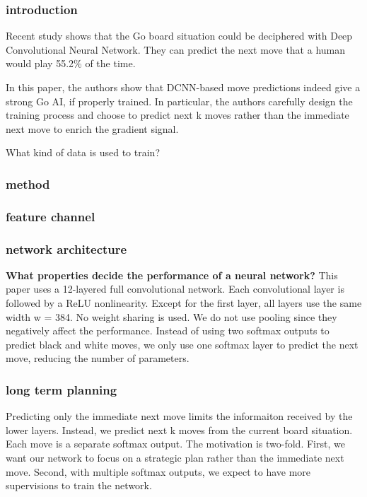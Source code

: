 \subsubsection{introduction}
Recent study shows that the Go board situation could be deciphered with Deep Convolutional Neural Network. They can predict the next move that a human would play 55.2\% of the time.

In this paper, the authors show that DCNN-based move predictions indeed give a strong Go AI, if properly trained. In particular, the authors carefully design the training process and choose to predict next k moves rather than the immediate next move to enrich the gradient signal.

What kind of data is used to train?
\subsubsection{method}
\subsubsection{feature channel}
\subsubsection{network architecture}
\textbf{What properties decide the performance of a neural network?}
This paper uses a 12-layered full convolutional network. Each convolutional layer is followed by a ReLU nonlinearity. Except for the first layer, all layers use the same width w = 384. No weight sharing is used. We do not use pooling since they negatively affect the performance. Instead of using two softmax outputs to predict black and white moves, we only use one softmax layer to predict the next move, reducing the number of parameters.
\subsubsection{long term planning}
Predicting only the immediate next move limits the informaiton received by the lower layers. Instead, we predict next k moves from the current board situation. Each move is a separate softmax output. The motivation is two-fold. First, we want our network to focus on a strategic plan rather than the immediate next move. Second, with multiple softmax outputs, we expect to have more supervisions to train the network. 
